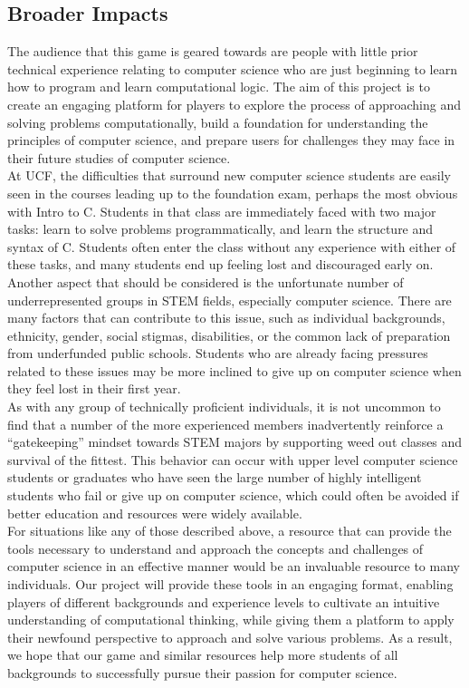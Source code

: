 \documentclass{article}
\begin{document}
\subsection{Broader Impacts}

The audience that this game is geared towards are people with little prior
technical experience relating to computer science who are just beginning to
learn how to program and learn computational logic. The aim of this project is
to create an engaging platform for players to explore the process of approaching
and solving problems computationally, build a foundation for understanding the
principles of computer science, and prepare users for challenges they may face
in their future studies of computer science.\\

At UCF, the difficulties that surround new computer science students are easily
seen in the courses leading up to the foundation exam, perhaps the most obvious
with Intro to C. Students in that class are immediately faced with two major
tasks: learn to solve problems programmatically, and learn the structure and
syntax of C. Students often enter the class without any experience with either
of these tasks, and many students end up feeling lost and discouraged early
on.\\

Another aspect that should be considered is the unfortunate number of
underrepresented groups in STEM fields, especially computer science. There are
many factors that can contribute to this issue, such as individual backgrounds,
ethnicity, gender, social stigmas, disabilities, or the common lack of
preparation from underfunded public schools. Students who are already facing
pressures related to these issues may be more inclined to give up on computer
science when they feel lost in their first year.\\

As with any group of technically proficient individuals, it is not uncommon to
find that a number of the more experienced members inadvertently reinforce a
“gatekeeping” mindset towards STEM majors by supporting weed out classes and
survival of the fittest. This behavior can occur with upper level computer
science students or graduates who have seen the large number of highly
intelligent students who fail or give up on computer science, which could often
be avoided if better education and resources were widely available.\\

For situations like any of those described above, a resource that can provide
the tools necessary to understand and approach the concepts and challenges of
computer science in an effective manner would be an invaluable resource to many
individuals. Our project will provide these tools in an engaging format,
enabling players of different backgrounds and experience levels to cultivate an
intuitive understanding of computational thinking, while giving them a platform
to apply their newfound perspective to approach and solve various problems. As a
result, we hope that our game and similar resources help more students of all
backgrounds to successfully pursue their passion for computer science.\\
\end{document}
